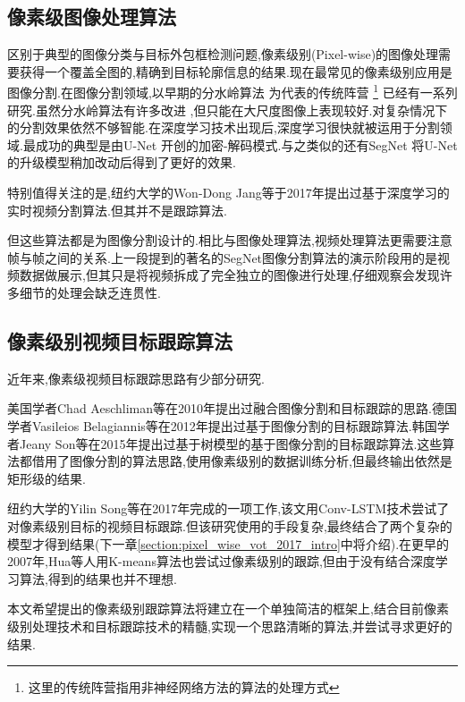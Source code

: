 \subsection{像素级图像处理算法}
区别于典型的图像分类与目标外包框检测问题,像素级别(Pixel-wise)的图像处理需要获得一个覆盖全图的,精确到目标轮廓信息的结果.现在最常见的像素级别应用是图像分割.在图像分割领域,以早期的分水岭算法
\supercite{olsen1997multi}
为代表的传统阵营
\footnote{这里的传统阵营指用非神经网络方法的算法的处理方式}
已经有一系列研究.虽然分水岭算法有许多改进
\supercite{grau2004improved}
,但只能在大尺度图像上表现较好.对复杂情况下的分割效果依然不够智能.在深度学习技术出现后,深度学习很快就被运用于分割领域.最成功的典型是由U-Net
\supercite{ronneberger2015u}
开创的加密-解码模式.与之类似的还有SegNet
\supercite{badrinarayanan2017segnet}
将U-Net的升级模型稍加改动后得到了更好的效果.
\par
特别值得关注的是,纽约大学的Won-Dong Jang等于2017年提出过基于深度学习的实时视频分割算法\supercite{jang2017online}.但其并不是跟踪算法.
\par
但这些算法都是为图像分割设计的.相比与图像处理算法,视频处理算法更需要注意帧与帧之间的关系.上一段提到的著名的SegNet图像分割算法的演示阶段用的是视频数据做展示,但其只是将视频拆成了完全独立的图像进行处理,仔细观察会发现许多细节的处理会缺乏连贯性.

\subsection{像素级别视频目标跟踪算法}
近年来,像素级视频目标跟踪思路有少部分研究.
\par
美国学者Chad Aeschliman等在2010年提出过融合图像分割和目标跟踪的思路\supercite{aeschliman2010probabilistic}.德国学者Vasileios Belagiannis等在2012年提出过基于图像分割的目标跟踪算法\supercite{belagiannis2012segmentation}.韩国学者Jeany Son等在2015年提出过基于树模型的基于图像分割的目标跟踪算法\supercite{son2015tracking}.这些算法都借用了图像分割的算法思路,使用像素级别的数据训练分析,但最终输出依然是矩形级的结果.
\par
纽约大学的Yilin Song等在2017年完成的一项工作\supercite{DBLP:journals/corr/abs-1711-07377},该文用Conv-LSTM技术\supercite{PatrauceanHC16}尝试了对像素级别目标的视频目标跟踪.但该研究使用的手段复杂,最终结合了两个复杂的模型才得到结果(下一章\ref{section:pixel_wise_vot_2017_intro}中将介绍).在更早的2007年,Hua等人用K-means算法也尝试过像素级别的跟踪\supercite{hua2008k},但由于没有结合深度学习算法,得到的结果也并不理想.
\par
本文希望提出的像素级别跟踪算法将建立在一个单独简洁的框架上,结合目前像素级别处理技术和目标跟踪技术的精髓,实现一个思路清晰的算法,并尝试寻求更好的结果.

